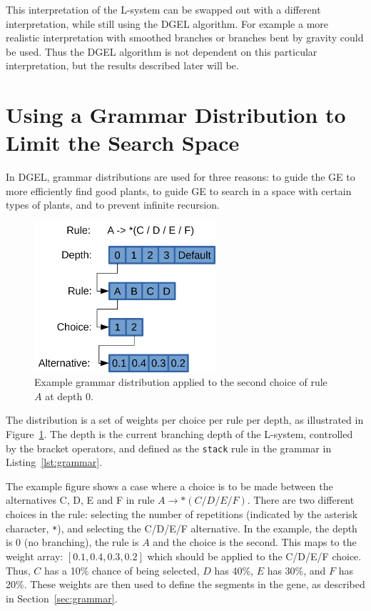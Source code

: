 This interpretation of the \gls{L-system} can be swapped out with a different interpretation, while still using the \gls{DGEL} algorithm.
For example a more realistic interpretation with smoothed branches or branches bent by gravity could be used.
Thus the \gls{DGEL} algorithm is not dependent on this particular interpretation, but the results described later will be.

\section{Using a Grammar Distribution to Limit the Search Space}
In \gls{DGEL}, grammar distributions are used for three reasons: to guide the \gls{GE} to more efficiently find good plants, to guide \gls{GE} to search in a space with certain types of plants, and to prevent infinite recursion.

\begin{figure}
    \centering
    \includegraphics[width=0.6\textwidth]{figures/distribution}
    \caption[Example grammar distribution]{Example grammar distribution applied to the second choice of rule $A$ at depth 0.}
    \label{fig:distribution}
\end{figure}

The distribution is a set of weights per choice per rule per depth, as illustrated in Figure~\ref{fig:distribution}.
The depth is the current branching depth of the \gls{L-system}, controlled by the bracket operators, and defined as the \texttt{stack} rule in the grammar in Listing~\ref{lst:grammar}.

The example figure shows a case where a choice is to be made between the alternatives C, D, E and F in rule $A \rightarrow *(C / D / E / F)$.
There are two different choices in the rule: selecting the number of repetitions (indicated by the asterisk character, \texttt{*}), and selecting the C/D/E/F alternative.
In the example, the depth is 0 (no branching), the rule is $A$ and the choice is the second.
This maps to the weight array: $[0.1, 0.4, 0.3, 0.2]$ which should be applied to the C/D/E/F choice.
Thus, $C$ has a 10\% chance of being selected, $D$ has 40\%, $E$ has 30\%, and $F$ has 20\%.
These weights are then used to define the segments in the gene, as described in Section~\ref{sec:grammar}.

